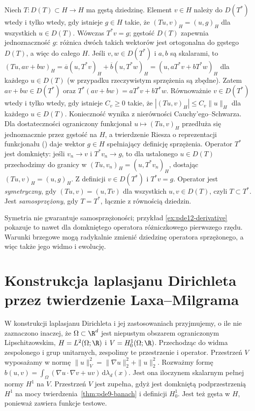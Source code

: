 \begin{definicja}
\label{def:pde12-adjoint}
Niech $T:D(T)\subset H\to H$ ma gęstą dziedzinę.
Element $v\in H$ należy do $D(T^*)$ wtedy i tylko wtedy,
gdy istnieje $g\in H$ takie, że
$(Tu,v)_H=(u,g)_H$ dla wszystkich $u\in D(T)$.
Wówczas $T^*v=g$; gęstość $D(T)$ zapewnia
jednoznaczność $g$: różnica dwóch takich wektorów
jest ortogonalna do gęstego $D(T)$, a więc do całego $H$.
Jeśli $v,w\in D(T^*)$ i $a,b$ są skalarami, to
$(Tu,av+bw)_H=\overline a(u,T^*v)_H+
\overline b(u,T^*w)_H=(u,aT^*v+bT^*w)_H$
dla każdego $u\in D(T)$ (w przypadku rzeczywistym
sprzężenia są zbędne). Zatem $av+bw\in D(T^*)$ oraz
$T^*(av+bw)=aT^*v+bT^*w$.
Równoważnie $v\in D(T^*)$ wtedy i tylko wtedy, gdy
istnieje $C_v\ge0$ takie, że
$|(Tu,v)_H|\le C_v\|u\|_H$ dla każdego $u\in D(T)$.
Konieczność wynika z nierówności Cauchy'ego--Schwarza.
Dla dostateczności ograniczony funkcjonał $u\mapsto(Tu,v)_H$
przedłuża się jednoznacznie przez gęstość na $H$, a twierdzenie
Riesza o reprezentacji funkcjonału
()
daje wektor $g\in H$ spełniający definicję sprzężenia.
Operator $T^*$ jest domknięty: jeśli $v_n\to v$
i $T^*v_n\to g$, to dla ustalonego $u\in D(T)$ przechodzimy
do granicy w $(Tu,v_n)_H=(u,T^*v_n)_H$, dostając
$(Tu,v)_H=(u,g)_H$. Z definicji $v\in D(T^*)$ i $T^*v=g$.
Operator jest \emph{symetryczny}, gdy
$(Tu,v)=(u,Tv)$ dla wszystkich $u,v\in D(T)$,
czyli $T\subset T^*$. Jest \emph{samosprzężony}, gdy
$T=T^*$, łącznie z równością dziedzin.
\end{definicja}

\begin{uwaga}
Symetria nie gwarantuje samosprzężoności; przykład
\ref{ex:pde12-derivative} pokazuje to nawet dla domkniętego
operatora różniczkowego pierwszego rzędu. Warunki brzegowe
mogą radykalnie zmienić dziedzinę operatora sprzężonego,
a więc także jego widmo i ewolucję.
\end{uwaga}

\section{Konstrukcja laplasjanu Dirichleta przez twierdzenie Laxa--Milgrama}
\label{sec:pde12-dirichlet}

W konstrukcji laplasjanu Dirichleta i jej zastosowaniach
przyjmujemy, o ile nie zaznaczono inaczej, że
$\Omega\subset\R^d$ jest niepustym obszarem ograniczonym
Lipschitzowskim, $H=L^2(\Omega;\R)$ i $V=H_0^1(\Omega;\R)$.
Przechodząc do widma zespolonego i grup unitarnych,
zespolimy te przestrzenie i operator. Przestrzeń $V$
wyposażamy w normę
$\|u\|_V^2=\|\nabla u\|_2^2+\|u\|_2^2$.
Rozważmy formę $b(u,v)=\int_\Omega(\nabla u\cdot\nabla v+uv)
\,\mathrm d\lambda_d(x)$. Jest ona iloczynem skalarnym
pełnej normy $H^1$ na $V$. Przestrzeń $V$ jest zupełna,
gdyż jest domkniętą podprzestrzenią $H^1$ na mocy
twierdzenia~\ref{thm:pde9-banach} i definicji $H_0^1$.
Jest też gęsta w $H$, ponieważ zawiera funkcje testowe.

